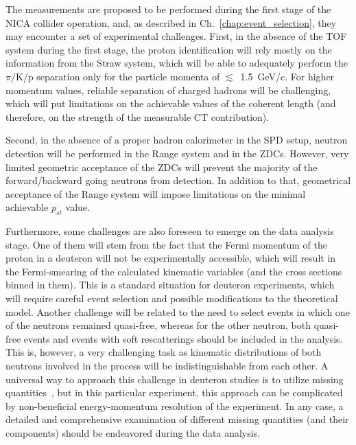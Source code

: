 The measurements are proposed to be performed during the first stage of the NICA collider operation, and, as described in Ch.~\ref{chap:event_selection}, they may encounter a set of experimental challenges. First, in the absence of the TOF system during the first stage, the proton identification will rely mostly on the information from the Straw system, which will be able to adequately perform the $\pi$/K/p separation only for the particle momenta of $\lesssim$~1.5~GeV/c. For higher momentum values, reliable separation of charged hadrons will be challenging, which will put limitations on the achievable values of the coherent length (and therefore, on the strength of the measurable CT contribution).

Second, in the absence of a proper hadron calorimeter in the SPD setup, neutron detection will be performed in the Range system and in the ZDCs.  However, very limited geometric acceptance of the ZDCs will prevent the majority of the forward/backward going neutrons from detection. In addition to that, geometrical acceptance of the Range system will impose limitations on the minimal achievable $p_{st}$ value.

Furthermore, some challenges are also foreseen to emerge on the data analysis stage. One of them will stem from the fact that the Fermi momentum of the proton in a deuteron will not be experimentally accessible, which will result in the Fermi-smearing of the calculated kinematic variables (and the cross sections binned in them). This is a standard situation for deuteron experiments, which will require careful event selection and possible modifications to the theoretical model. Another challenge will be related to the need to select events in which one of the neutrons remained quasi-free, whereas for the other neutron, both quasi-free events and events with soft rescatterings should be included in the analysis. This is, however, a very challenging task as kinematic distributions of both neutrons involved in the process will be indistinguishable from each other. A universal way to approach this challenge in deuteron studies is to utilize missing quantities~\cite{CLAS:2023mfc,my_an_note:2020,my_thesis:2021,Skorodumina:2015rea, CLAS:2022kta,note_mm_distr}, but in this particular experiment, this approach can be complicated by non-beneficial energy-momentum resolution of the experiment. In any case, a detailed and comprehensive examination of different missing quantities (and their components) should be endeavored during the data analysis. 


